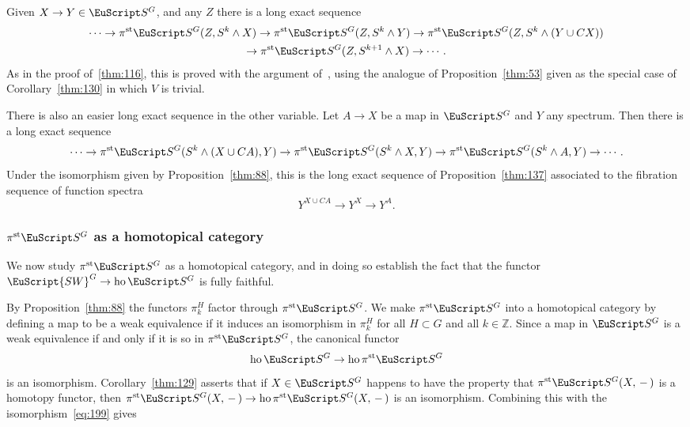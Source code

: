 \documentclass{amsart}
\theoremstyle{definition}
\theoremstyle{remark}
\newcommand{\Z}{{\mathbb Z}}
\newcommand{\slot}{\,-\,}
\newcommand{\spectra}{\EuScript S}
\newcommand{\swg}[1]{\EuScript {SW}^{#1}}
\DeclareMathOperator{\ho}{ho}
\newcommand{\ugspectra}[1]{\spectra^{#1}}
\newcommand{\pist}{\pi^{\text{st}}}
\begin{document}
Given $X\to Y\in\ugspectra{G}$, and any $Z$ there is a long exact
sequence
\begin{multline}
\label{eq:166}
\cdots\to \pist\ugspectra{G}(Z,S^{k}\wedge X)
\to \pist\ugspectra{G}(Z,S^{k}\wedge Y)
\to \pist\ugspectra{G}(Z,S^{k}\wedge (Y\cup CX)) \\
\to \pist\ugspectra{G}(Z,S^{k+1}\wedge X)\to\cdots.
\end{multline}
As in the proof of~\ref{thm:116}, this is proved with the argument
of~\cite[III.2.1]{LMayS}, using the analogue of
Proposition~\ref{thm:53} given as the special case of
Corollary~\ref{thm:130} in which $V$ is trivial.

There is also an easier long exact sequence in the other variable.
Let $A\to X$ be a map in $\ugspectra{G}$ and $Y$ any spectrum.  Then
there is a long exact sequence
\begin{equation}
\label{eq:168}
\cdots 
\to \pist\ugspectra{G}(S^{k}\wedge (X\cup CA),Y)
\to \pist\ugspectra{G}(S^{k}\wedge X,Y) 
\to \pist\ugspectra{G}(S^{k}\wedge A,Y) \to\cdots.
\end{equation}
Under the isomorphism given by Proposition~\ref{thm:88}, this is the long
exact sequence of Proposition~\ref{thm:137} associated to the
fibration sequence of function spectra
\[
Y^{X\cup CA} \to Y^{X}\to Y^{A}.
\]


\subsubsection{$\pist\ugspectra{G}$ as a homotopical category} 
\label{sec:pist-as-homot} 

We now study $\pist\ugspectra{G}$ as a homotopical category, and in
doing so establish the fact that the functor $\swg{G}\to
\ho\ugspectra{G}$ is fully faithful.

By Proposition~\ref{thm:88} the functors $\pi^{H}_{k}$ factor through
$\pist\ugspectra{G}$.  We make $\pist\ugspectra{G}$ into a homotopical
category by defining a map to be a weak equivalence if it induces an
isomorphism in $\pi^{H}_{k}$ for all $H\subset G$ and all $k\in\Z$.
Since a map in $\ugspectra{G}$ is a weak equivalence if and only if it
is so in $\pist\ugspectra{G}$, the canonical functor
\begin{equation}
\label{eq:199}
\ho\ugspectra{G} \to \ho\pist\ugspectra{G}
\end{equation}
is an isomorphism.  Corollary~\ref{thm:129} asserts that if $X\in\ugspectra{G}$ happens to
have the property that $\pist\ugspectra{G}(X,\slot)$ is a homotopy
functor, then $\pist\ugspectra{G}(X,\slot)\to
\ho\pist\ugspectra{G}(X,\slot)$ is an isomorphism.   Combining this
with the isomorphism~\eqref{eq:199} gives
\end{document}
